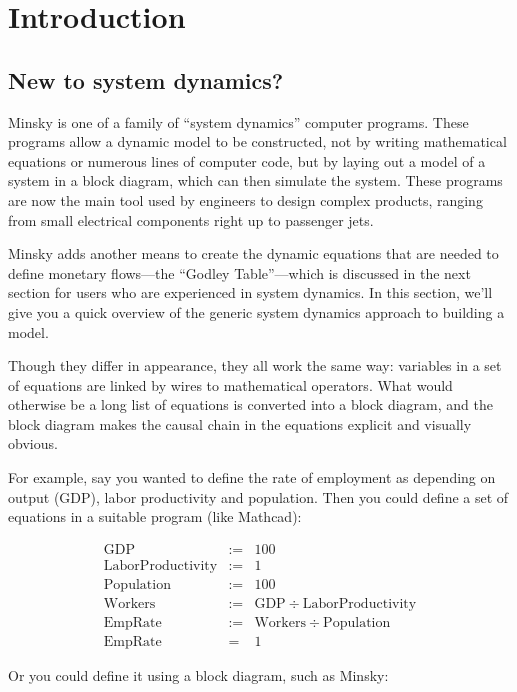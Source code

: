 \chapter{Introduction}
\label{Introduction}

\section{New to system dynamics?}
\label{intro:new}

Minsky is one of a family of ``system dynamics'' computer
programs. These programs allow a dynamic model to be constructed, not
by writing mathematical equations or numerous lines of computer code,
but by laying out a model of a system in a block diagram, which can then
simulate the system. These programs are now the main tool used by
engineers to design complex products, ranging from small electrical
components right up to passenger jets.


Minsky adds another means to create the dynamic equations that are
needed to define monetary flows---the ``Godley Table''---which is
discussed in the next section for users who are experienced in
system dynamics. In this section, we'll give you a quick overview of
the generic system dynamics approach to building a model.


Though they differ in appearance, they all work the same way:
variables in a set of equations are linked by wires to mathematical
operators. What would otherwise be a long list of equations is
converted into a block diagram, and the block diagram makes the causal chain
in the equations explicit and visually obvious.

For example, say you wanted to define the rate of employment as
depending on output (GDP), labor productivity and population. Then you
could define a set of equations in a suitable program (like Mathcad):

\begin{eqnarray*}
\mathrm{GDP}&:=&100\\
\mathrm{LaborProductivity}&:=&1\\
\mathrm{Population}&:=&100\\
\mathrm{Workers}&:=&\mathrm{GDP}\div\mathrm{LaborProductivity}\\
\mathrm{EmpRate}&:=&\mathrm{Workers}\div\mathrm{Population}\\
\mathrm{EmpRate}&=&1
\end{eqnarray*}

Or you could define it using a block diagram, such as Minsky:

